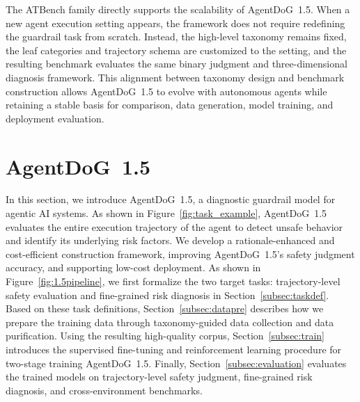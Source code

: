 \documentclass{llmxive}
\providecommand{\agentdog}{AgentDoG~1.5\xspace}
\begin{document}
The ATBench family directly supports the scalability of \agentdog{}.
When a new agent execution setting appears, the framework does not require redefining the guardrail task from scratch.
Instead, the high-level taxonomy remains fixed, the leaf categories and trajectory schema are customized to the setting, and the resulting benchmark evaluates the same binary judgment and three-dimensional diagnosis framework.
This alignment between taxonomy design and benchmark construction allows \agentdog{} to evolve with autonomous agents while retaining a stable basis for comparison, data generation, model training, and deployment evaluation.

\section{\agentdog{}}
\label{sec:agentdog}

In this section, we introduce \agentdog{}, a diagnostic guardrail model for agentic AI systems. As shown in Figure~\ref{fig:task_example}, \agentdog{} evaluates the entire execution trajectory of the agent to detect unsafe behavior and identify its underlying risk factors. We develop a rationale-enhanced and cost-efficient construction framework, improving \agentdog{}'s safety judgment accuracy, and supporting low-cost deployment. As shown in Figure~\ref{fig:1.5pipeline}, we first formalize the two target tasks: trajectory-level safety evaluation and fine-grained risk diagnosis in Section~\ref{subsec:taskdef}. Based on these task definitions, Section~\ref{subsec:datapre} describes how we prepare the training data through taxonomy-guided data collection and data purification. Using the resulting high-quality corpus, Section~\ref{subsec:train} introduces the supervised fine-tuning and reinforcement learning procedure for two-stage training \agentdog{}. Finally, Section~\ref{subsec:evaluation} evaluates the trained models on trajectory-level safety judgment, fine-grained risk diagnosis, and cross-environment benchmarks.
\end{document}
